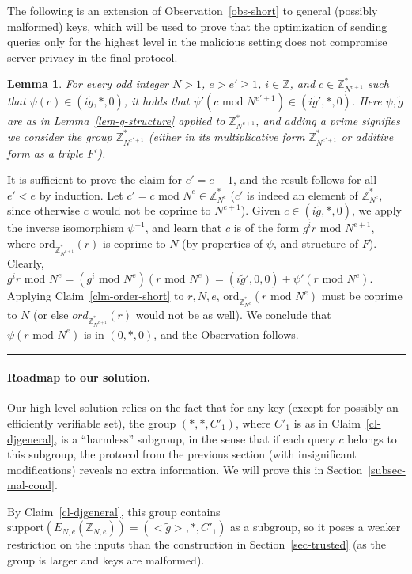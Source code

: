 \documentclass[11pt]{article}
\newtheorem{lemma}[theorem]{Lemma}
\newenvironment{proof}{\noindent {\bf Proof:} \hspace{.677em}}%
                     {\qed}
\newcommand{\qed}{\hspace*{\fill}\rule{0.6em}{0.6em}}
\newcommand{\encdj}{{E}_{N,e}}
\newcommand{\Z}{\mathbb{Z}}
\newcommand{\U}[1]{\mathbb{Z}_{#1}^*}
\newcommand{\order}{{\mathrm{ord}}}
\newcommand{\support}{{\mathrm{support}}}
\renewcommand{\mod}{{\,\,\mathrm{mod}\,\,}}
\begin{document}
The following is an extension of Observation~\ref{obs-short} to
general (possibly malformed) keys, which will be used to prove that
the optimization of sending queries only for the highest level in
the malicious setting does not compromise server privacy in the
final protocol.
\begin{lemma}
\label{lem-short-mal} For every odd integer $N>1$, $e>e'\geq 1$,
$i\in\Z$, and $c\in \U{N^{e+1}}$ such that 
$\psi(c)\in(i\tilde{g},*,0)$, it holds that $\psi'(c\mod
N^{e'+1})\in(i\tilde{g}',*,0)$. Here $\psi,\tilde{g}$ are as in Lemma~\ref{lem-g-structure} applied to $\U{N^{e+1}}$, and adding a prime signifies we consider the group $\U{N^{e'+1}}$ (either in its multiplicative form $\U{N^{e'+1}}$ or additive form as a triple $F'$).
\end{lemma}
\begin{proof}
It is sufficient to prove the claim for $e'=e-1$, and the result
follows for all $e'<e$ by induction. Let $c'=c\mod N^e\in \U{N^e}$
($c'$ is indeed an element of $\U{N^e}$, since otherwise $c$
would not be coprime to $N^{e+1}$). Given $c\in(i\tilde{g},*,0)$, we
apply the inverse isomorphism $\psi^{-1}$, and learn that $c$ is of
the form $g^ir \mod N^{e+1}$, where $\order_{\U{N^{e+1}}}(r)$ is
coprime to $N$ (by properties of $\psi$, and structure of $F$). Clearly,
$g^ir\mod N^e=(g^i\mod N^e)(r\mod
N^e)=(i\tilde{g}',0,0)+\psi'(r\mod N^e)$. Applying
Claim~\ref{clm-order-short} to $r,N,e$, $\order_{\U{N^e}}(r\mod
N^e)$ must be coprime to $N$ (or else $ord_{\U{N^{e+1}}}(r)$ would not be as well). We conclude that $\psi(r\mod N^e)$ is in $(0,*,0)$, and the Observation follows.
\end{proof}


\paragraph{Roadmap to our solution.} Our high level solution
relies on the fact that for any key (except for possibly an
efficiently verifiable set), the group $(*,*,C'_1)$, where $C'_1$ is as in
Claim~\ref{cl-djgeneral}, is a ``harmless'' subgroup, in the
sense that if each query $c$ belongs to this subgroup, the protocol
from the previous section (with insignificant modifications) reveals no extra information. We will prove this in Section~\ref{subsec-mal-cond}.

By Claim~\ref{cl-djgeneral}, this group contains
$\support(\encdj(\Z_{N,e}))=(<\tilde{g}>,*,C'_1)$ as a subgroup, so it poses a weaker
restriction on the inputs than the construction in
Section~\ref{sec-trusted} (as the group is larger and keys are malformed). 
\end{document}
